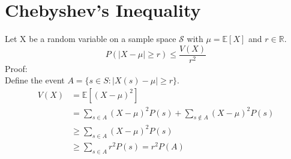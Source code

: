 \documentclass{article}
\theoremstyle{mytheoremstyle}
\theoremstyle{mytheoremstyle}
\theoremstyle{myproblemstyle}
\begin{document}
    \section*{Chebyshev's Inequality}
    Let X be a random variable on a sample space $\mathcal{S}$ with $\mu = \mathbb{E}[X]$
    and $r\in \mathbb{R}$.
    \[
        P(|X-\mu| \ge r) \le \frac{V(X)}{r^2}
    \]
    Proof: \\
    Define the event $A = \{s\in S : |X(s)-\mu| \ge r\}$.
    \begin{align*}
        V(X) &= \mathbb{E}[(X-\mu)^2] \\
             &= \sum_{s\in A} (X-\mu)^2 P(s) + \sum_{s\not\in A} (X-\mu)^2 P(s) \\
             &\ge \sum_{s\in A} (X-\mu)^2 P(s) \\
             &\ge \sum_{s\in A} r^2 P(s) = r^2 P(A)
    \end{align*}
\end{document}
